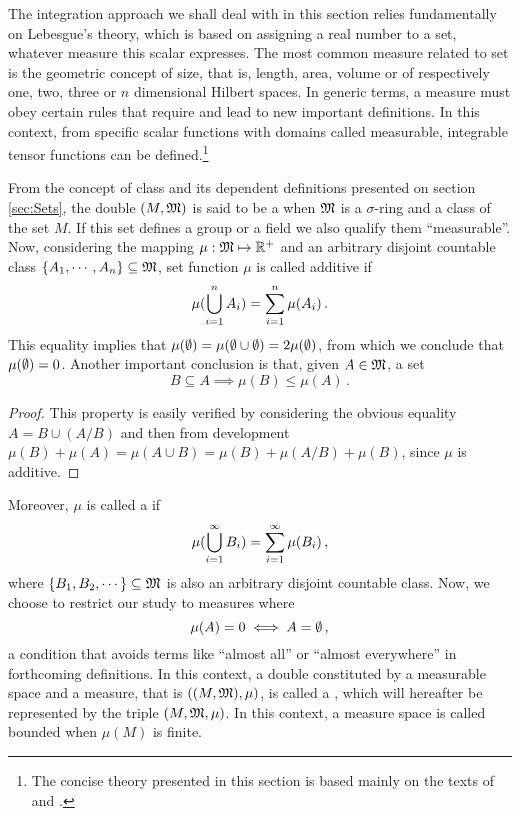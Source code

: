 The integration approach we shall deal with in this section relies fundamentally on Lebesgue's theory, which is based on assigning a real number to a set, whatever measure this scalar expresses. The most common measure related to set is the geometric concept of size, that is, length, area, volume or  of respectively one, two, three or $n$ dimensional Hilbert spaces. In generic terms, a measure must obey certain rules that require and lead to new important definitions. In this context, from specific scalar functions with domains called measurable, integrable tensor functions can be defined.\footnote{The concise theory presented in this section is based mainly on the texts of \cite{halmos_1974_1} and \cite{lang_1993_3}.}

From the concept of class and its dependent definitions presented on section \ref{sec:Sets}, the double $(M,\mathfrak{M})$ is said to be a  when $\mathfrak{M}$ is a $\sigma$-ring and a class of the set $M$. If this set defines a group or a field we also qualify them ``measurable''. Now, considering the mapping $\mu : \mathfrak{M} \mapsto \mathbb{R}^+$ and an arbitrary disjoint countable class $\{A_1,\cdots,A_n\}\subseteq\mathfrak{M}$, set function $\mu$ is called additive if
\begin{equation}\label{eq:addMeasure}
\mu(\bigcup_{i=1}^nA_i)=\sum_{{i}=1}^n\mu(A_i)\,.
\end{equation}
This equality implies that $\mu(\emptyset)=\mu(\emptyset\cup\emptyset)=2\mu(\emptyset)$, from which we conclude that $\mu(\emptyset)=0$. Another important conclusion is that, given $A\in\mathfrak{M}$, a set
\begin{equation}
B\subseteq A\implies \mu(B)\leqslant\mu(A)\,.
\end{equation}
{\footnotesize
\begin{proof}
This property is easily verified by considering the obvious equality $A=B\cup(A/B)$ and then from development $\mu(B)+\mu(A)=\mu(A\cup B)= \mu(B)+\mu(A/B)+\mu(B)$, since $\mu$ is additive.
\end{proof}}
\noindent Moreover, $\mu$ is called a  if
\begin{equation}\label{eq:measuSum}
\mu(\bigcup_{i=1}^\infty B_i)=\sum_{{i}=1}^\infty\mu(B_i)\,,
\end{equation}
where $\{B_1,B_2,\cdots\}\subseteq\mathfrak{M}$ is also an arbitrary disjoint countable class. Now, we choose to restrict our study to measures where
\begin{equation}
\mu(A)=0\iff A=\emptyset\,,
\end{equation}
a condition that avoids terms like ``almost all'' or ``almost everywhere'' in forthcoming definitions. In this context, a double constituted by a measurable space and a measure, that is $((M,\mathfrak{M}),\mu)$, is called a , which will hereafter be represented by the triple $(M,\mathfrak{M},\mu)$. In this context, a measure space is called bounded  when $\mu(M)$ is finite.


